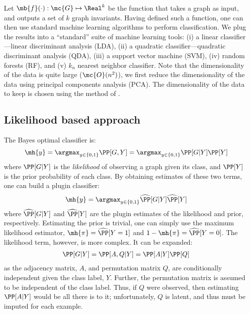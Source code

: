 Let $\mb{f}(\cdot): \mc{G} \mapsto \Real^k$ be the function that takes a graph as input, and outputs a set of $k$ graph invariants.  Having defined such a function, one can then use standard machine learning algorithms to perform classification.  We plug the results into a ``standard'' suite of machine learning tools: (i) a linear classifier---linear discriminant analysis (LDA), (ii) a quadratic classifier---quadratic discriminant analysis (QDA), (iii) a support vector machine (SVM), (iv) random forests (RF), and (v) $k_n$ nearest neighbor classifier.  Note that the dimensionality of the data is quite large ($\mc{O}(n^2)$), we first reduce the dimensionality of the data using principal components analysis (PCA).  The dimensionality of the data to keep is chosen using the method of \cite{??}.

\subsection{Likelihood based approach} %
\label{sec:lik}

The Bayes optimal classifier is:
\begin{align}
	\mh{y} = \argmax_{y \in \{0,1\}} \PP[G,Y] = \argmax_{y \in \{0,1\}} \PP[G | Y] \PP[Y]
\end{align}
where $\PP[G|Y]$ is the \emph{likelihood} of observing a graph given its class, and $\PP[Y]$ is the prior probability of each class.  By obtaining estimates of these two terms, one can build a plugin classifier:
\begin{align}
	\mh{y} = \argmax_{y \in \{0,1\}} \mhP[G | Y] \mhP[Y]	
\end{align}
where $\mhP[G|Y]$ and $\mhP[Y]$ are the plugin estimates of the likelihood and prior, respectively.  Estimating the prior is trivial, one can simply use the maximum likelihood estimator, $\mh{\pi}=\mhP[Y=1]$ and $1-\mh{\pi}=\mhP[Y=0]$.  The likelihood term, however, is more complex.  It can be expanded:
\begin{align}
	\PP[G|Y] = \PP[A,Q | Y] = \PP[A | Y] \PP[Q]
\end{align}
as the adjacency matrix, $A$, and permutation matrix $Q$, are conditionally independent given the class label, $Y$.  Further, the permutation matrix is assumed to be independent of the class label.  Thus, if $Q$ were observed, then estimating $\PP[A|Y]$ would be all there is to it; unfortunately, $Q$ is latent, and thus must be imputed for each example.  

